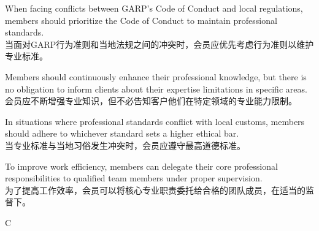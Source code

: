 \documentclass{article}
\begin{document}
    \begin{choices}
        \item When facing conflicts between GARP's Code of Conduct and local regulations, members should prioritize the Code of Conduct to maintain professional standards.\\
        当面对GARP行为准则和当地法规之间的冲突时，会员应优先考虑行为准则以维护专业标准。
    
        \item Members should continuously enhance their professional knowledge, but there is no obligation to inform clients about their expertise limitations in specific areas.\\
        会员应不断增强专业知识，但不必告知客户他们在特定领域的专业能力限制。
    
        \item In situations where professional standards conflict with local customs, members should adhere to whichever standard sets a higher ethical bar.\\
        当专业标准与当地习俗发生冲突时，会员应遵守最高道德标准。
    
        \item To improve work efficiency, members can delegate their core professional responsibilities to qualified team members under proper supervision.\\
        为了提高工作效率，会员可以将核心专业职责委托给合格的团队成员，在适当的监督下。
    \end{choices}
    
    \begin{correctanswer}
    C
    \end{correctanswer}
    
\end{document}
